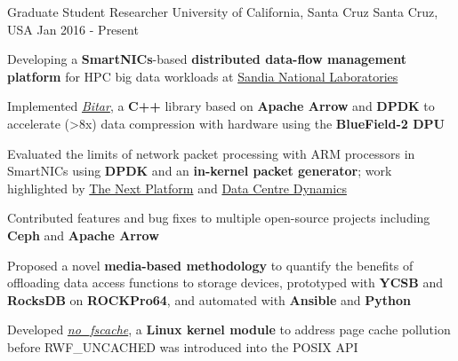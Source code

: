 

\begin{cventries}

  \cventry
    {Graduate Student Researcher} %
    {University of California, Santa Cruz} %
    {Santa Cruz, USA} %
    {Jan 2016 - Present} %
    {
      \begin{cvitems} %
        \item {Developing a \textbf{SmartNICs}-based \textbf{distributed data-flow management platform} for HPC big data workloads at \href{https://www.sandia.gov/}{Sandia National Laboratories}}
        \item {Implemented \href{https://github.com/ljishen/bitar}{\textit{Bitar}}, a \textbf{C++} library based on \textbf{Apache Arrow} and \textbf{DPDK} to accelerate (\textgreater 8x) data compression with hardware using the \textbf{BlueField-2 DPU}}
        \item {Evaluated the limits of network packet processing with ARM processors in SmartNICs using \textbf{DPDK} and an \textbf{in-kernel packet generator}; work highlighted by \href{https://www.nextplatform.com/2021/05/24/testing-the-limits-of-the-bluefield-2-smartnic/}{The Next Platform} and \href{https://www.datacenterdynamics.com/en/news/intel-pitches-infrastructure-processing-unit-as-new-data-center-dpu/}{Data Centre Dynamics}}
        \item {Contributed features and bug fixes to multiple open-source projects including \textbf{Ceph} and \textbf{Apache Arrow}}
        \item {Proposed a novel \textbf{media-based methodology} to quantify the benefits of offloading data access functions to storage devices, prototyped with \textbf{YCSB} and \textbf{RocksDB} on \textbf{ROCKPro64}, and automated with \textbf{Ansible} and \textbf{Python}}
        \item {Developed \href{https://github.com/ljishen/nofscache}{\textit{no\_fscache}}, a \textbf{Linux kernel module} to address page cache pollution before RWF\_UNCACHED was introduced into the POSIX API}
      \end{cvitems}
    }


\end{cventries}
